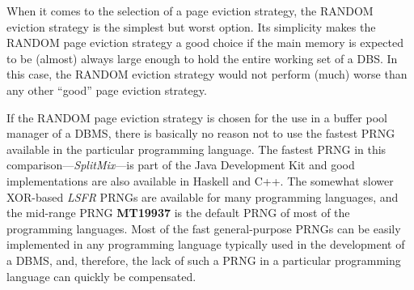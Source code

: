     When it comes to the selection of a page eviction strategy, the RANDOM eviction strategy is the simplest but worst option. Its simplicity makes the RANDOM page eviction strategy a good choice if the main memory is expected to be (almost) always large enough to hold the entire working set of a DBS. In this case, the RANDOM eviction strategy would not perform (much) worse than any other ``good'' page eviction strategy.

    If the RANDOM page eviction strategy is chosen for the use in a buffer pool manager of a DBMS, there is basically no reason not to use the fastest PRNG available in the particular programming language. The fastest PRNG in this comparison---\emph{SplitMix}---is part of the Java Development Kit and good implementations are also available in Haskell and C++. The somewhat slower XOR-based \emph{LSFR} PRNGs are available for many programming languages, and the mid-range PRNG \textbf{MT19937} is the default PRNG of most of the programming languages. Most of the fast general-purpose PRNGs can be easily implemented in any programming language typically used in the development of a DBMS, and, therefore, the lack of such a PRNG in a particular programming language can quickly be compensated.

